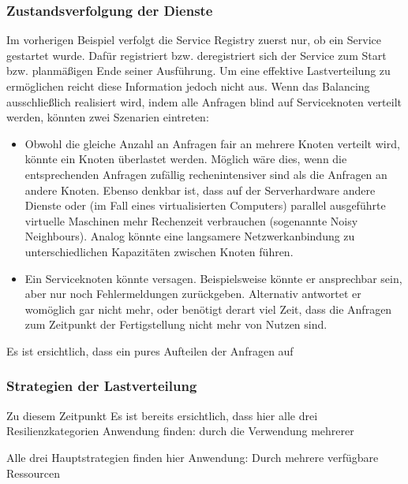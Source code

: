 \subsubsection{Zustandsverfolgung der Dienste}
Im vorherigen Beispiel verfolgt die Service Registry zuerst nur, ob ein Service gestartet wurde. Dafür registriert bzw. deregistriert sich der Service zum Start bzw. planmäßigen Ende seiner Ausführung. Um eine effektive Lastverteilung zu ermöglichen reicht diese Information jedoch nicht aus. Wenn das Balancing ausschließlich realisiert wird, indem alle Anfragen \glq blind\grq{} auf Serviceknoten verteilt werden, könnten zwei Szenarien eintreten:
\begin{itemize}
	\item Obwohl die gleiche Anzahl an Anfragen fair an mehrere Knoten verteilt wird, könnte ein Knoten überlastet werden. Möglich wäre dies, wenn die entsprechenden Anfragen zufällig rechenintensiver sind als die Anfragen an andere Knoten. Ebenso denkbar ist, dass auf der Serverhardware andere Dienste oder (im Fall eines virtualisierten Computers) parallel ausgeführte virtuelle Maschinen mehr Rechenzeit verbrauchen (sogenannte \glqq Noisy Neighbours\grqq{}). Analog könnte eine langsamere Netzwerkanbindung zu unterschiedlichen Kapazitäten zwischen Knoten führen.
	\item Ein Serviceknoten könnte versagen. Beispielsweise könnte er ansprechbar sein, aber nur noch Fehlermeldungen zurückgeben. Alternativ antwortet er womöglich gar nicht mehr, oder benötigt derart viel Zeit, dass die Anfragen zum Zeitpunkt der Fertigstellung nicht mehr von Nutzen sind.
\end{itemize}

Es ist ersichtlich, dass ein pures Aufteilen der Anfragen auf 

\subsubsection{Strategien der Lastverteilung}
Zu diesem Zeitpunkt 
Es ist bereits ersichtlich, dass hier alle drei Resilienzkategorien Anwendung finden: durch die Verwendung mehrerer 

Alle drei Hauptstrategien finden hier Anwendung: Durch mehrere verfügbare Ressourcen 